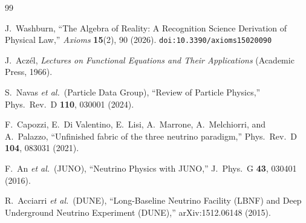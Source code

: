 \documentclass[12pt,a4paper]{article}
\theoremstyle{definition}
\theoremstyle{remark}
\begin{document}
\begin{thebibliography}{99}

J.~Washburn, ``The Algebra of Reality: A Recognition Science Derivation
of Physical Law,'' \emph{Axioms} \textbf{15}(2), 90 (2026).
\texttt{doi:10.3390/axioms15020090}

J.~Acz\'el, \emph{Lectures on Functional Equations and Their
Applications} (Academic Press, 1966).

S.~Navas \textit{et al.}\ (Particle Data Group),
``Review of Particle Physics,'' Phys.\ Rev.\ D \textbf{110}, 030001
(2024).

F.~Capozzi, E.~Di Valentino, E.~Lisi, A.~Marrone,
A.~Melchiorri, and A.~Palazzo, ``Unfinished fabric of the three
neutrino paradigm,'' Phys.\ Rev.\ D \textbf{104}, 083031 (2021).

F.~An \textit{et al.}\ (JUNO), ``Neutrino Physics with JUNO,''
J.\ Phys.\ G \textbf{43}, 030401 (2016).

R.~Acciarri \textit{et al.}\ (DUNE), ``Long-Baseline Neutrino
Facility (LBNF) and Deep Underground Neutrino Experiment (DUNE),''
arXiv:1512.06148 (2015).

\end{thebibliography}
\end{document}
